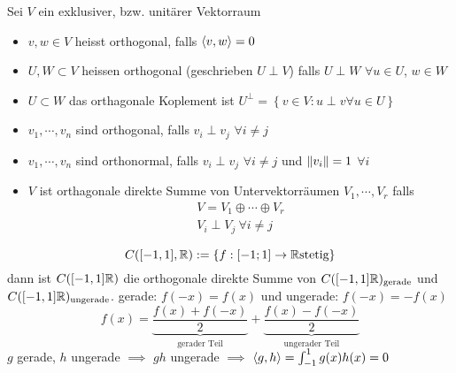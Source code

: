 \begin{Def}
  Sei $V$ ein exklusiver, bzw. unitärer Vektorraum
  \begin{itemize}
    \item $v,w\in V$ heisst orthogonal, falls $\left\langle v,w \right\rangle=0$
    \item $U,W\subset V$ heissen orthogonal (geschrieben $U\perp V$) falls $U\perp W$ $\forall u\in U$, $w\in W$
    \item $U\subset W$ das orthagonale Koplement ist $U^\perp=\left\{ v\in V: u\perp v \forall u\in U \right\}$
    \item $v_1,\cdots, v_n$ sind orthogonal, falls $v_i\perp v_j$ $\forall i\neq j$
    \item $v_1,\cdots, v_n$ sind orthonormal, falls $v_i\perp v_j$ $\forall i\neq j$ und $\left\| v_i \right\|=1$ $\forall i$
    \item $V$ ist orthagonale direkte Summe von Untervektorräumen $V_1,\cdots,V_r$ falls 
      \begin{align*}
        V=V_1\oplus \cdots \oplus V_r\\
        V_i\perp V_j\ \forall i\neq j
      \end{align*}
  \end{itemize}
  \[C([-1,1],\mathbb{R}):=\left\{ f:[-1;1]\to \mathbb{R} \text{stetig} \right\}\]
  dann ist $C([-1,1]\mathbb{R})$ die orthogonale direkte Summe von $C([-1,1]\mathbb{R})_\text{gerade}$ und $C([-1,1]\mathbb{R})_\text{ungerade}$. gerade: $f(-x)=f(x)$ und ungerade: $f(-x)=-f(x)$ %
  \[f(x)=\underbrace{\frac{f(x)+f(-x)}{2}}_\text{gerader Teil} + \underbrace{\frac{f(x)-f(-x)}{2}}_\text{ungerader Teil}\]
  $g$ gerade, $h$ ungerade $\implies$ $gh$ ungerade $\implies$ $\left\langle g,h \right\rangle = \int_{-1}^1g(x)h(x)=0$
\end{Def}
